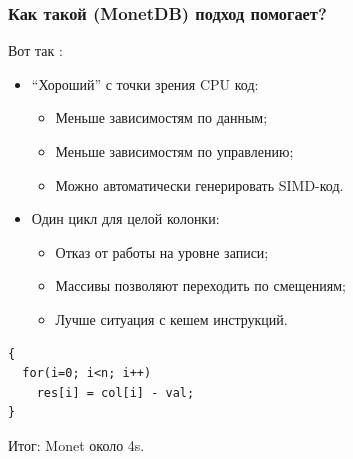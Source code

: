 \documentclass{beamer}
\begin{document}
\begin{frame}[fragile]
\frametitle{Как такой (MonetDB) подход помогает?}

Вот так \cite{Boncz2008, Harizopoulos2009}:

\begin{itemize}
  \setlength\itemsep{1em}
  \item ``Хороший''  с точки зрения CPU код:
  \begin{itemize}
    \item Меньше зависимостям по данным;
    \item Меньше зависимостям по управлению;
    \item Можно автоматически генерировать SIMD-код.
  \end{itemize}
  \item Один цикл для целой колонки:
  \begin{itemize}
    \item Отказ от работы на уровне записи;
    \item Массивы позволяют переходить по смещениям;
    \item Лучше ситуация с кешем инструкций.
  \end{itemize}
  
\end{itemize}

\lstset{language=C}

\begin{lstlisting}
{
  for(i=0; i<n; i++)
    res[i] = col[i] - val;
}    
\end{lstlisting}

Итог: Monet около 4s.

\end{frame}
\end{document}

